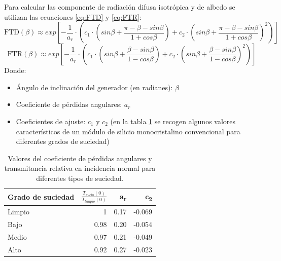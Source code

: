 Para calcular las componente de radiación difusa isotrópica y de albedo se utilizan las ecuaciones \ref{eq:FTD} y \ref{eq:FTR}:
\begin{equation}
\text{FTD}(\beta) \approx exp[-\frac{1}{a_r}\cdot (c_1\cdot (sin\beta +\frac{\pi -\beta - sin\beta}{1+cos\beta})+c_2\cdot (sin\beta +\frac{\pi -\beta -sin\beta}{1+cos\beta})^2)]
\label{eq:FTD}
\end{equation}
\begin{equation}
\text{FTR}(\beta) \approx exp[-\frac{1}{a_r}\cdot (c_1\cdot (sin\beta +\frac{\beta - sin\beta}{1-cos\beta})+c_2\cdot (sin\beta +\frac{\beta -sin\beta}{1-cos\beta})^2)]
\end{equation}
\label{eq:FTR}
Donde:
\begin{itemize}
\item Ángulo de inclinación del generador (en radianes): \(\beta\) 
\item Coeficiente de pérdidas angulares: \(a_r\)
\item Coeficientes de ajuste: \(c_1\) y \(c_2\) (en la tabla \ref{tab:coef-perd} se recogen algunos valores característicos de un módulo de silicio monocristalino convencional para diferentes grados de suciedad)
\end{itemize}
\begin{table}[]
\caption{Valores del coeficiente de pérdidas angulares y transmitancia relativa en incidencia normal para diferentes tipos de suciedad. \label{tab:coef-perd}}
\centering
\begin{tabular}{lrrr}
\hline
Grado de suciedad & \(\frac{T_{sucio}(0)}{T_{limpio}(0)}\) & a\textsubscript{r} & c\textsubscript{2}\\[0pt]
\hline
Limpio & 1 & 0.17 & -0.069\\[0pt]
\hline
Bajo & 0.98 & 0.20 & -0.054\\[0pt]
\hline
Medio & 0.97 & 0.21 & -0.049\\[0pt]
\hline
Alto & 0.92 & 0.27 & -0.023\\[0pt]
\hline
\end{tabular}
\end{table}

